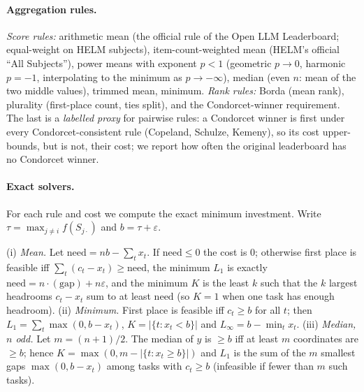 \paragraph{Aggregation rules.}
\emph{Score rules:} arithmetic mean (the official rule of the Open LLM Leaderboard; equal-weight on HELM subjects), item-count-weighted mean (HELM's official ``All Subjects''), power means with exponent $p<1$ (geometric $p\!\to\!0$, harmonic $p=-1$, interpolating to the minimum as $p\to-\infty$), median (even $n$: mean of the two middle values), trimmed mean, minimum. \emph{Rank rules:} Borda (mean rank), plurality (first-place count, ties split), and the Condorcet-winner requirement. The last is a \emph{labelled proxy} for pairwise rules: a Condorcet winner is first under every Condorcet-consistent rule (Copeland, Schulze, Kemeny), so its cost upper-bounds, but is not, their cost; we report how often the original leaderboard has no Condorcet winner.

\paragraph{Exact solvers.}
For each rule and cost we compute the exact minimum investment. Write $\tau=\max_{j\ne i}f(S_{j\cdot})$ and $b=\tau+\varepsilon$.

\begin{proposition}\label{prop:closed}
(i) \emph{Mean.} Let $\mathrm{need}=n b-\sum_t x_t$. If $\mathrm{need}\le 0$ the cost is $0$; otherwise first place is feasible iff $\sum_t(c_t-x_t)\ge\mathrm{need}$, the minimum $L_1$ is exactly $\mathrm{need}=n\cdot(\text{gap})+n\varepsilon$, and the minimum $K$ is the least $k$ such that the $k$ largest headrooms $c_t-x_t$ sum to at least $\mathrm{need}$ (so $K=1$ when one task has enough headroom).
(ii) \emph{Minimum.} First place is feasible iff $c_t\ge b$ for all $t$; then $L_1=\sum_t\max(0,b-x_t)$, $K=|\{t:x_t<b\}|$ and $L_\infty=b-\min_t x_t$.
(iii) \emph{Median, $n$ odd.} Let $m=(n+1)/2$. The median of $y$ is $\ge b$ iff at least $m$ coordinates are $\ge b$; hence $K=\max(0,m-|\{t:x_t\ge b\}|)$ and $L_1$ is the sum of the $m$ smallest gaps $\max(0,b-x_t)$ among tasks with $c_t\ge b$ (infeasible if fewer than $m$ such tasks).
\end{proposition}

